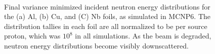 \begin{figure}
    \centering    
    \\
    \caption{Final variance minimized incident neutron energy distributions for the (a) Al, (b) Cu, and (C) Nb foils, as simulated in MCNP6. The distribution tallies in each foil are all normalized to be per source proton, which was $10^8$ in all simulations. As the beam is degraded, neutron energy distributions become visibly downscattered.}
     \label{fig:ipf_ntallies}
\end{figure}











